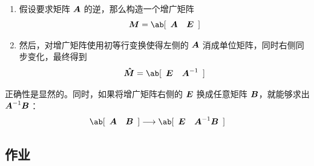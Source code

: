 \begin{enumerate}
	\item 假设要求矩阵 $\boldsymbol{A}$ 的逆，那么构造一个增广矩阵
	$$
	\matr{M} = \ab[\begin{array}{c:c}
		\matr{A} & \matr{E}
	\end{array}]
	$$

	\item 然后，对增广矩阵使用初等行变换使得左侧的 $\boldsymbol{A}$ 消成单位矩阵，同时右侧同步变化，最终得到
	$$
	\matr{\hat M} = \ab[\begin{array}{c:c}
		\matr{E} & \matr{A}^{-1}
	\end{array}]
	$$
\end{enumerate}

正确性是显然的。同时，如果将增广矩阵右侧的 $\boldsymbol{E}$ 换成任意矩阵 $\boldsymbol{B}$，就能够求出 $\boldsymbol{A}^{-1} \boldsymbol{B}$：
$$
\ab[\begin{array}{c:c}
	\matr{A} & \matr{B}
\end{array}] \longrightarrow
\ab[\begin{array}{c:c}
	\matr{E} & \matr{A}^{-1} \matr{B}
\end{array}]
$$

\subsection{作业}

